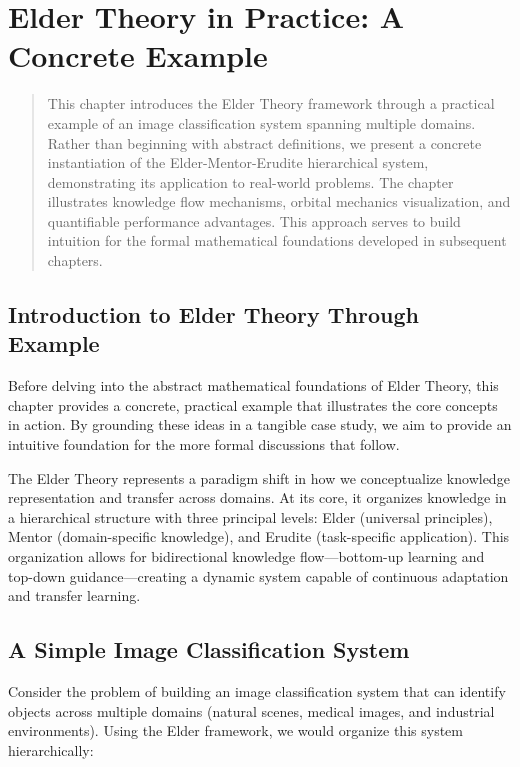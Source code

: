 \chapter{Elder Theory in Practice: A Concrete Example}

\begin{abstract}
This chapter introduces the Elder Theory framework through a practical example of an image classification system spanning multiple domains. Rather than beginning with abstract definitions, we present a concrete instantiation of the Elder-Mentor-Erudite hierarchical system, demonstrating its application to real-world problems. The chapter illustrates knowledge flow mechanisms, orbital mechanics visualization, and quantifiable performance advantages. This approach serves to build intuition for the formal mathematical foundations developed in subsequent chapters.
\end{abstract}

\section{Introduction to Elder Theory Through Example}

Before delving into the abstract mathematical foundations of Elder Theory, this chapter provides a concrete, practical example that illustrates the core concepts in action. By grounding these ideas in a tangible case study, we aim to provide an intuitive foundation for the more formal discussions that follow.

The Elder Theory represents a paradigm shift in how we conceptualize knowledge representation and transfer across domains. At its core, it organizes knowledge in a hierarchical structure with three principal levels: Elder (universal principles), Mentor (domain-specific knowledge), and Erudite (task-specific application). This organization allows for bidirectional knowledge flow—bottom-up learning and top-down guidance—creating a dynamic system capable of continuous adaptation and transfer learning.

\section{A Simple Image Classification System}

Consider the problem of building an image classification system that can identify objects across multiple domains (natural scenes, medical images, and industrial environments). Using the Elder framework, we would organize this system hierarchically:

